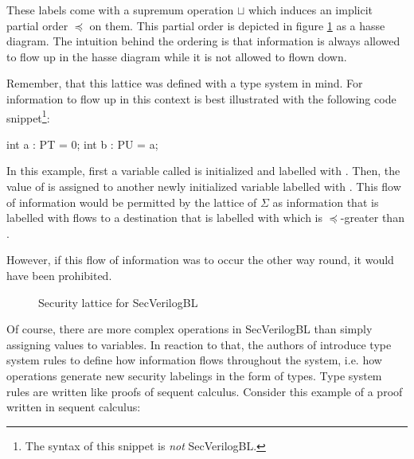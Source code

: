 These labels come with a supremum operation $ \sqcup $ which induces an implicit partial order $ \preceq $ on them.
This partial order is depicted in figure \ref{fig:sec-lattice} as a hasse diagram.
The intuition behind the ordering is that information is always allowed to flow up in the hasse diagram while it is not allowed to flown down.

\begin{example}
    Remember, that this lattice was defined with a type system in mind.
    For information to flow up in this context is best illustrated with the following code snippet\footnote{%
        The syntax of this snippet is \textit{not} SecVerilogBL.%
    }:
    \begin{asl}
int a : PT = 0;
int b : PU = a;
    \end{asl}

    In this example, first a variable called  is initialized and labelled with \PT{}.
    Then, the value of  is assigned to another newly initialized variable labelled with \PU{}.
    This flow of information would be permitted by the lattice of $ \Sigma $ as information that is labelled with \PT{} flows to a destination that is labelled with \PU{} which is $ \preceq $-greater than \PT{}.

    However, if this flow of information was to occur the other way round, it would have been prohibited.
\end{example}

\begin{figure}
    \centering
    \caption{Security lattice for SecVerilogBL \cite{Ferraiuolo17}}
    \label{fig:sec-lattice}
\end{figure}

Of course, there are more complex operations in SecVerilogBL than simply assigning values to variables.
In reaction to that, the authors of \cite{Ferraiuolo17} introduce type system rules to define how information flows throughout the system, i.e. how operations generate new security labelings in the form of types.
Type system rules are written like proofs of sequent calculus.
Consider this example of a proof written in sequent calculus:
\begin{prooftree}
\end{prooftree}

